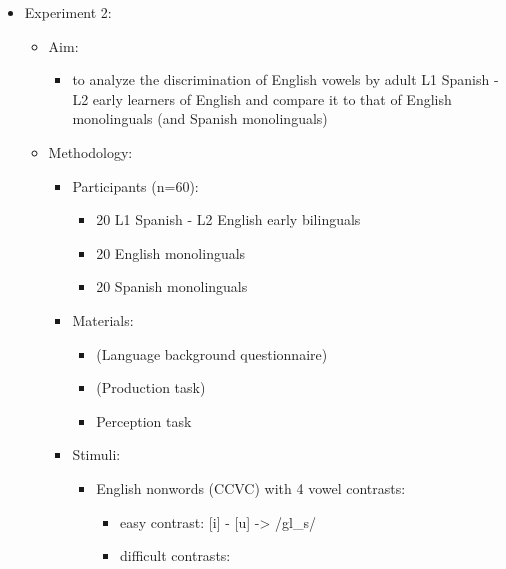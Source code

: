 \documentclass[
]{article}
\providecommand{\tightlist}{%
  \setlength{\itemsep}{0pt}\setlength{\parskip}{0pt}}
\begin{document}
\begin{itemize}
  \begin{itemize}
  \tightlist
  \item
    Experiment 2:

    \begin{itemize}
    \tightlist
    \item
      Aim:

      \begin{itemize}
      \tightlist
      \item
        to analyze the discrimination of English vowels by adult L1
        Spanish - L2 early learners of English and compare it to that of
        English monolinguals (and Spanish monolinguals)
      \end{itemize}
    \item
      Methodology:

      \begin{itemize}
      \tightlist
      \item
        Participants (n=60):

        \begin{itemize}
        \tightlist
        \item
          20 L1 Spanish - L2 English early bilinguals
        \item
          20 English monolinguals
        \item
          20 Spanish monolinguals
        \end{itemize}
      \item
        Materials:

        \begin{itemize}
        \tightlist
        \item
          (Language background questionnaire)
        \item
          (Production task)
        \item
          Perception task
        \end{itemize}
      \item
        Stimuli:

        \begin{itemize}
        \tightlist
        \item
          English nonwords (CCVC) with 4 vowel contrasts:

          \begin{itemize}
          \tightlist
          \item
            easy contrast: {[}i{]} - {[}u{]} -\textgreater{} /gl\_s/
          \item
            difficult contrasts:


\end{itemize}
\end{itemize}
\end{itemize}
\end{itemize}
\end{itemize}
\end{itemize}
\end{document}
